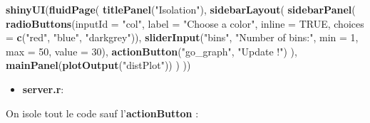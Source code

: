 \documentclass[
]{article}
\newenvironment{Shaded}{\begin{snugshade}}{\end{snugshade}}
\newcommand{\AttributeTok}[1]{\textcolor[rgb]{0.13,0.29,0.53}{#1}}
\newcommand{\ConstantTok}[1]{\textcolor[rgb]{0.56,0.35,0.01}{#1}}
\newcommand{\ControlFlowTok}[1]{\textcolor[rgb]{0.13,0.29,0.53}{\textbf{#1}}}
\newcommand{\DecValTok}[1]{\textcolor[rgb]{0.00,0.00,0.81}{#1}}
\newcommand{\FunctionTok}[1]{\textcolor[rgb]{0.13,0.29,0.53}{\textbf{#1}}}
\newcommand{\NormalTok}[1]{#1}
\newcommand{\OtherTok}[1]{\textcolor[rgb]{0.56,0.35,0.01}{#1}}
\newcommand{\SpecialCharTok}[1]{\textcolor[rgb]{0.81,0.36,0.00}{\textbf{#1}}}
\newcommand{\StringTok}[1]{\textcolor[rgb]{0.31,0.60,0.02}{#1}}
\providecommand{\tightlist}{%
  \setlength{\itemsep}{0pt}\setlength{\parskip}{0pt}}
\begin{document}
\begin{Shaded}
\begin{Highlighting}[]
\FunctionTok{shinyUI}\NormalTok{(}\FunctionTok{fluidPage}\NormalTok{(}
  \FunctionTok{titlePanel}\NormalTok{(}\StringTok{"Isolation"}\NormalTok{),}
  \FunctionTok{sidebarLayout}\NormalTok{(}
    \FunctionTok{sidebarPanel}\NormalTok{(}
      \FunctionTok{radioButtons}\NormalTok{(}\AttributeTok{inputId =} \StringTok{"col"}\NormalTok{, }\AttributeTok{label =} \StringTok{"Choose a color"}\NormalTok{, }\AttributeTok{inline =} \ConstantTok{TRUE}\NormalTok{,}
                   \AttributeTok{choices =} \FunctionTok{c}\NormalTok{(}\StringTok{"red"}\NormalTok{, }\StringTok{"blue"}\NormalTok{, }\StringTok{"darkgrey"}\NormalTok{)),}
      \FunctionTok{sliderInput}\NormalTok{(}\StringTok{"bins"}\NormalTok{, }\StringTok{"Number of bins:"}\NormalTok{, }\AttributeTok{min =} \DecValTok{1}\NormalTok{, }\AttributeTok{max =} \DecValTok{50}\NormalTok{, }\AttributeTok{value =} \DecValTok{30}\NormalTok{),}
      \FunctionTok{actionButton}\NormalTok{(}\StringTok{"go\_graph"}\NormalTok{, }\StringTok{"Update !"}\NormalTok{)}
\NormalTok{    ),}
    \FunctionTok{mainPanel}\NormalTok{(}\FunctionTok{plotOutput}\NormalTok{(}\StringTok{"distPlot"}\NormalTok{))}
\NormalTok{  )}
\NormalTok{))}
\end{Highlighting}
\end{Shaded}

\begin{itemize}
\tightlist
\item
  \textbf{server.r}:
\end{itemize}

On isole tout le code sauf l'\textbf{actionButton} :

\begin{Shaded}
\end{Shaded}
\end{document}
